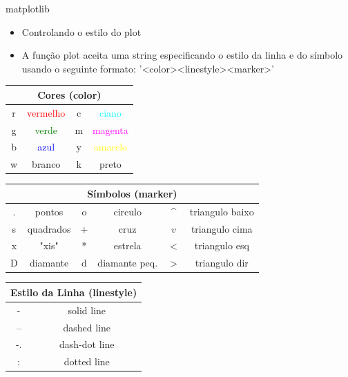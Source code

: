 \documentclass[12pt,t,graphics]{beamer}
\begin{document}
\begin{frame}[t,fragile]{matplotlib}
	\begin{itemize}
		\item Controlando o estilo do plot
		\item A função plot aceita uma string especificando o estilo da linha
		e do símbolo usando o seguinte formato: '<color><linestyle><marker>'
	\end{itemize}
	
	\begin{tiny}
		
		\begin{table}
			\centering
			\begin{tabular}[r]{|cc||cc|}
				\hline
				\multicolumn{4}{|c|}{Cores (color)} \\
				\hline
				r & \textcolor{red}{vermelho} & c & \textcolor{cyan}{ciano} \\
				g & \textcolor{green}{verde}  & m & \textcolor{magenta}{magenta} \\
				b & \textcolor{blue}{azul}    & y & \textcolor{yellow}{amarelo} \\
				w & branco                    & k & preto \\
				\hline
			\end{tabular}
		\end{table}
		
		\vspace{-0.25cm}
		
		\begin{table}
			\centering
			\begin{tabular}[c]{|cc||cc||cc|}
				\hline
				\multicolumn{6}{|c|}{Símbolos (marker)} \\
				\hline
				. & pontos     & o & circulo       & \^{} & triangulo baixo \\
				s & quadrados  & + & cruz          & $v$ & triangulo cima  \\
				x & "xis"      & * & estrela       & $<$ & triangulo esq   \\
				D & diamante   & d & diamante peq. & $>$ & triangulo dir   \\
				\hline
			\end{tabular}
		\end{table}
		
		\vspace{-0.25cm}
		
		\begin{table}
			\centering
			\begin{tabular}[c]{|c||c|}
				\hline
				\multicolumn{2}{|c|}{Estilo da Linha (linestyle)} \\
				\hline
				-  & solid line    \\
				-- & dashed line   \\
				-. & dash-dot line \\
				:  & dotted line   \\
				\hline
			\end{tabular}
		\end{table}
	\end{tiny}
\end{frame}
\end{document}
